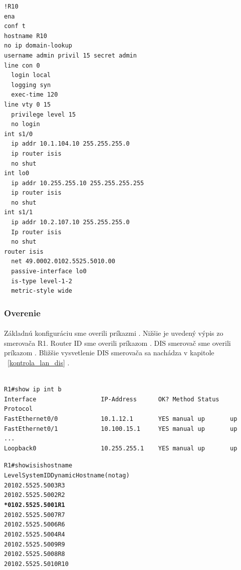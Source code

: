 \documentclass[12pt,twoside,a4paper]{report}
\begin{document}
{\begin{small}
\begin{verbatim}
!R10
ena
conf t
hostname R10
no ip domain-lookup
username admin privil 15 secret admin
line con 0
  login local
  logging syn
  exec-time 120
line vty 0 15
  privilege level 15
  no login
int s1/0
  ip addr 10.1.104.10 255.255.255.0
  ip router isis
  no shut
int lo0
  ip addr 10.255.255.10 255.255.255.255
  ip router isis
  no shut
int s1/1
  ip addr 10.2.107.10 255.255.255.0
  Ip router isis
  no shut
router isis
  net 49.0002.0102.5525.5010.00
  passive-interface lo0
  is-type level-1-2
  metric-style wide
\end{verbatim}
\end{small}
}

\subsubsection{Overenie}
\paragraph{}
Základnú konfiguráciu sme overili príkazmi . Nižšie je uvedený výpis zo smerovača R1. Router ID sme overili príkazom . DIS smerovač sme overili príkazom . Bližšie vysvetlenie DIS smerovača sa nachádza v kapitole ~\ref{kontrola_lan_dis} .

\noindent
{\selectfont
\begin{small}
\begin{verbatim}

R1#show ip int b
Interface                  IP-Address      OK? Method Status   Protocol
FastEthernet0/0            10.1.12.1       YES manual up       up      
FastEthernet0/1            10.100.15.1     YES manual up       up      
...    
Loopback0                  10.255.255.1    YES manual up       up  

\end{verbatim}
\end{small}
}

\noindent
{\selectfont
\begin{small}
\begin{alltt}

R1#show isis hostname
Level  System ID      Dynamic Hostname  (notag)
 2     0102.5525.5003 R3
 2     0102.5525.5002 R2
\textbf{     * 0102.5525.5001 R1}
 2     0102.5525.5007 R7
 2     0102.5525.5006 R6
 2     0102.5525.5004 R4
 2     0102.5525.5009 R9
 2     0102.5525.5008 R8
 2     0102.5525.5010 R10

\end{alltt}
\end{small}
}
\end{document}
